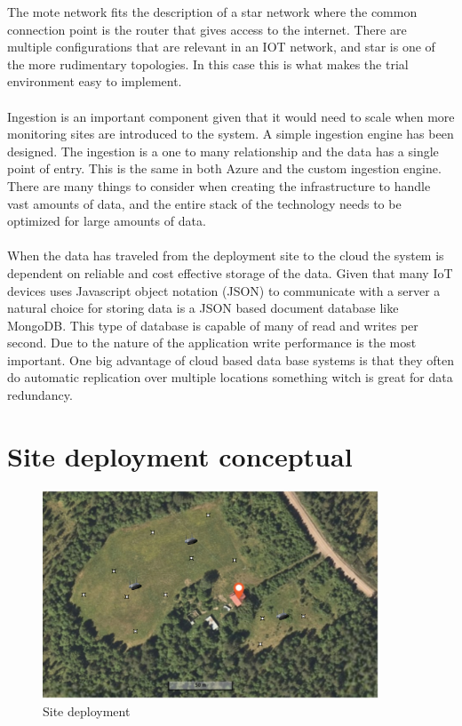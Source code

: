 \documentclass[]{uiophd}
\begin{document}
The mote network fits the description of a star network where the common connection point is the router that gives access to the internet. There are multiple configurations that are relevant in an IOT network, and star is one of the more rudimentary topologies. In this case this is what makes the trial environment easy to implement.
\\\\
Ingestion is an important component given that it would need to scale when more monitoring sites are introduced to the system. A simple ingestion engine has been designed. The ingestion is a one to many relationship and the data has a single point of entry. This is the same in both Azure and the custom ingestion engine. There are many things to consider when creating the infrastructure to handle vast amounts of data, and the entire stack of the technology needs to be optimized for large amounts of data.
\\\\
 When the data has traveled from the deployment site to the cloud the system is dependent on reliable and cost effective storage of the data. Given that many IoT devices uses Javascript object notation (JSON) to communicate with a server a natural choice for storing data is a JSON based document database like MongoDB. This type of database is capable of many of read and writes per second. Due to the nature of the application write performance is the most important. One big advantage of cloud based data base systems is that they often do automatic replication over multiple locations something witch is great for data redundancy.
 
 \section{Site deployment conceptual}
 \begin{figure}[h]
\caption{Site deployment}
\centering
\includegraphics[width=10cm]{hjemly.png}
\end{figure}
\end{document}
